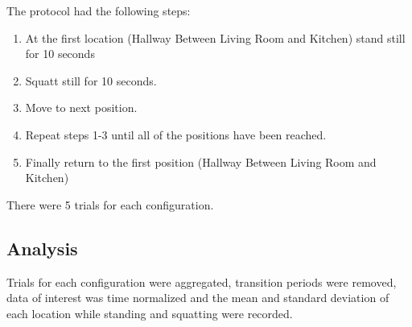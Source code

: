 The protocol had the following steps:
\begin{enumerate}
    \item At the first location (Hallway Between Living Room and Kitchen) stand still for 10 seconds
    \item Squatt still for 10 seconds.
    \item Move to next position.
    \item Repeat steps 1-3 until all of the positions have been reached.
    \item Finally return to the first position (Hallway Between Living Room and Kitchen)
\end{enumerate}

There were 5 trials for each configuration.

\subsection{Analysis}
Trials for each configuration were aggregated, transition periods were removed, 
data of interest was time normalized and the mean and standard deviation of each
location while standing and squatting were recorded.


